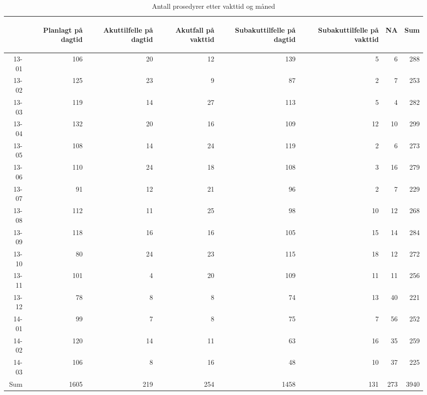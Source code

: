 \documentclass[presentation,xcolor=pdftex,dvipsnames,table]{beamer}
\begin{document}
\begin{frame}
\begin{tiny}
\begin{table}[ht]
\centering
\begin{tabular}{rrrrrrrr}
  \toprule
 & \begin{sideways} Planlagt på dagtid \end{sideways} & \begin{sideways} Akuttilfelle på dagtid \end{sideways} & \begin{sideways} Akutfall på vakttid \end{sideways} & \begin{sideways} Subakuttilfelle på dagtid \end{sideways} & \begin{sideways} Subakuttilfelle på vakttid \end{sideways} & \begin{sideways} NA \end{sideways} & \begin{sideways} Sum \end{sideways} \\ 
  \midrule
13-01 & 106 & 20 & 12 & 139 & 5 & 6 & 288 \\ 
  13-02 & 125 & 23 & 9 & 87 & 2 & 7 & 253 \\ 
  13-03 & 119 & 14 & 27 & 113 & 5 & 4 & 282 \\ 
  13-04 & 132 & 20 & 16 & 109 & 12 & 10 & 299 \\ 
  13-05 & 108 & 14 & 24 & 119 & 2 & 6 & 273 \\ 
  13-06 & 110 & 24 & 18 & 108 & 3 & 16 & 279 \\ 
  13-07 & 91 & 12 & 21 & 96 & 2 & 7 & 229 \\ 
  13-08 & 112 & 11 & 25 & 98 & 10 & 12 & 268 \\ 
  13-09 & 118 & 16 & 16 & 105 & 15 & 14 & 284 \\ 
  13-10 & 80 & 24 & 23 & 115 & 18 & 12 & 272 \\ 
  13-11 & 101 & 4 & 20 & 109 & 11 & 11 & 256 \\ 
  13-12 & 78 & 8 & 8 & 74 & 13 & 40 & 221 \\ 
  14-01 & 99 & 7 & 8 & 75 & 7 & 56 & 252 \\ 
  14-02 & 120 & 14 & 11 & 63 & 16 & 35 & 259 \\ 
  14-03 & 106 & 8 & 16 & 48 & 10 & 37 & 225 \\ 
  Sum & 1605 & 219 & 254 & 1458 & 131 & 273 & 3940 \\ 
   \bottomrule
\end{tabular}
\caption{Antall prosedyrer etter vakttid og måned} 
\end{table}\end{tiny}
\end{frame}
\end{document}

